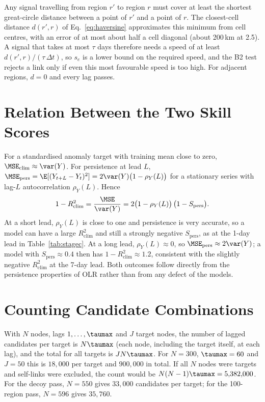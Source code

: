 Any signal travelling from region $r'$ to region $r$ must cover at least the shortest great-circle distance between a point of $r'$ and a point of $r$. The closest-cell distance $d(r',r)$ of Eq.~\eqref{eq:haversine} approximates this minimum from cell centres, with an error of at most about half a cell diagonal (about 200\,km at 2.5\dg). A signal that takes at most $\tau$ days therefore needs a speed of at least $d(r',r)/(\tau\,\Delta t)$, so $s_e$ is a lower bound on the required speed, and the B2 test rejects a link only if even this most favourable speed is too high. For adjacent regions, $d=0$ and every lag passes.

\section{Relation Between the Two Skill Scores}
\label{app:skill}

For a standardised anomaly target with training mean close to zero, $\MSE_{\mathrm{clim}}\approx\var(Y)$. For persistence at lead $L$, $\MSE_{\mathrm{pers}}=\E[(Y_{t+L}-Y_t)^2]=2\var(Y)\big(1-\rho_Y(L)\big)$ for a stationary series with lag-$L$ autocorrelation $\rho_Y(L)$. Hence
\begin{equation}
  1-R^2_{\mathrm{clim}} = \frac{\MSE}{\var(Y)} = 2\big(1-\rho_Y(L)\big)\,\big(1-S_{\mathrm{pers}}\big).
\end{equation}
At a short lead, $\rho_Y(L)$ is close to one and persistence is very accurate, so a model can have a large $R^2_{\mathrm{clim}}$ and still a strongly negative $S_{\mathrm{pers}}$, as at the 1-day lead in Table~\ref{tab:stagec}. At a long lead, $\rho_Y(L)\approx 0$, so $\MSE_{\mathrm{pers}}\approx 2\var(Y)$; a model with $S_{\mathrm{pers}}\approx 0.4$ then has $1-R^2_{\mathrm{clim}}\approx 1.2$, consistent with the slightly negative $R^2_{\mathrm{clim}}$ at the 7-day lead. Both outcomes follow directly from the persistence properties of OLR rather than from any defect of the models.

\section{Counting Candidate Combinations}
\label{app:count}

With $N$ nodes, lags $1,\dots,\taumax$ and $J$ target nodes, the number of lagged candidates per target is $N\taumax$ (each node, including the target itself, at each lag), and the total for all targets is $JN\taumax$. For $N=300$, $\taumax=60$ and $J=50$ this is $18{,}000$ per target and $900{,}000$ in total. If all $N$ nodes were targets and self-links were excluded, the count would be $N(N-1)\taumax=5{,}382{,}000$. For the decoy pass, $N=550$ gives $33{,}000$ candidates per target; for the 100-region pass, $N=596$ gives $35{,}760$.

